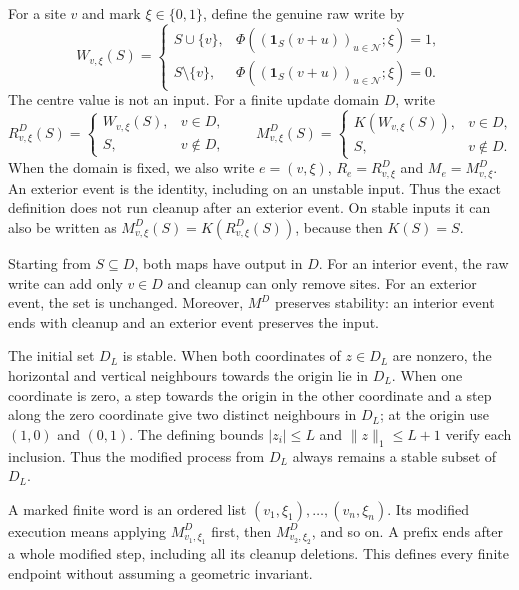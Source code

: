 \documentclass[
  11pt,
  a4paper,
]{article}
\begin{document}
For a site \(v\) and mark \(\xi\in\{0,1\}\), define the genuine raw
write by \[
W_{v,\xi}(S)=
\begin{cases}
S\cup\{v\},&\Phi((\mathbf1_S(v+u))_{u\in\mathcal N};\xi)=1,\\
S\setminus\{v\},&\Phi((\mathbf1_S(v+u))_{u\in\mathcal N};\xi)=0.
\end{cases}
\tag{MM2}
\] The centre value is not an input. For a finite update domain \(D\),
write \[
R^D_{v,\xi}(S)=
\begin{cases}W_{v,\xi}(S),&v\in D,\\ S,&v\notin D,\end{cases}
\qquad
M^D_{v,\xi}(S)=
\begin{cases}K(W_{v,\xi}(S)),&v\in D,\\ S,&v\notin D.\end{cases}
\tag{MM3}
\] When the domain is fixed, we also write \(e=(v,\xi)\),
\(R_e=R^D_{v,\xi}\) and \(M_e=M^D_{v,\xi}\). An exterior event is the
identity, including on an unstable input. Thus the exact definition does
not run cleanup after an exterior event. On stable inputs it can also be
written as \(M^D_{v,\xi}(S)=K(R^D_{v,\xi}(S))\), because then
\(K(S)=S\).

Starting from \(S\subseteq D\), both maps have output in \(D\). For an
interior event, the raw write can add only \(v\in D\) and cleanup can
only remove sites. For an exterior event, the set is unchanged.
Moreover, \(M^D\) preserves stability: an interior event ends with
cleanup and an exterior event preserves the input.

The initial set \(D_L\) is stable. When both coordinates of \(z\in D_L\)
are nonzero, the horizontal and vertical neighbours towards the origin
lie in \(D_L\). When one coordinate is zero, a step towards the origin
in the other coordinate and a step along the zero coordinate give two
distinct neighbours in \(D_L\); at the origin use \((1,0)\) and
\((0,1)\). The defining bounds \(|z_i|\leq L\) and \(\|z\|_1\leq L+1\)
verify each inclusion. Thus the modified process from \(D_L\) always
remains a stable subset of \(D_L\).

A marked finite word is an ordered list
\((v_1,\xi_1),\ldots,(v_n,\xi_n)\). Its modified execution means
applying \(M^D_{v_1,\xi_1}\) first, then \(M^D_{v_2,\xi_2}\), and so on.
A prefix ends after a whole modified step, including all its cleanup
deletions. This defines every finite endpoint without assuming a
geometric invariant.
\end{document}
